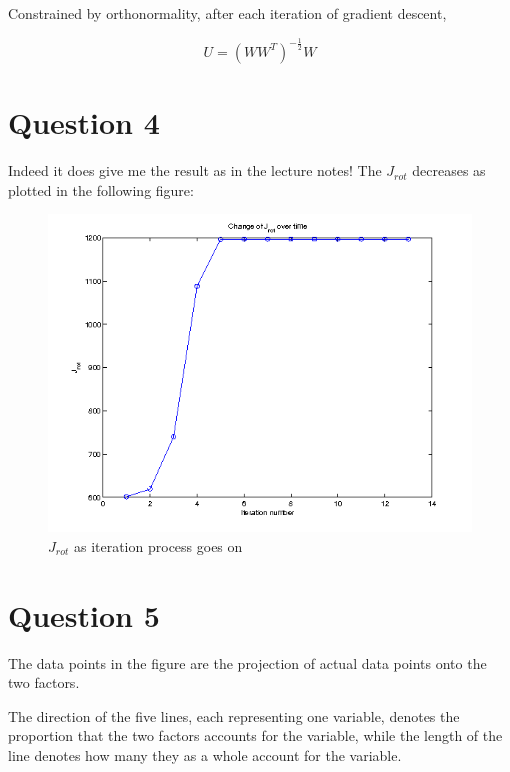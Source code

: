 \documentclass[paper=a4, fontsize=11pt]{scrartcl} %
\numberwithin{equation}{section} %
\numberwithin{figure}{section} %
\numberwithin{table}{section} %
\begin{document}
Constrained by orthonormality, after each iteration of gradient descent, 

\[U=(W W^T)^{-\frac {1} {2}}W \]


\section {Question 4}

Indeed it does give me the result as in the lecture notes! The $J_{rot}$ decreases as plotted in the following figure:

\begin{figure}[H]
  \centering
  \includegraphics[scale=.7]{J_rot}
  \caption{$J_{rot}$ as iteration process goes on}
\end{figure}


\section {Question 5}

The data points in the figure are the projection of actual data points onto the two factors.

The direction of the five lines, each representing one variable, denotes the proportion that the two factors accounts for the variable, while the length of the line denotes how many they as a whole account for the variable.
\end{document}
